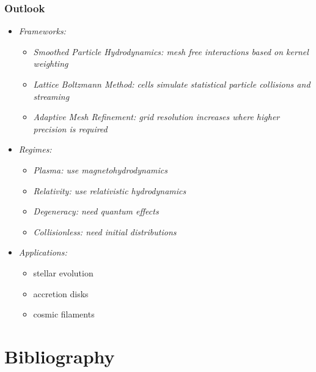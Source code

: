 	\begin{frame}
		\frametitle{Outlook}
		\begin{itemize}
			\item<2-> \itshape{Frameworks:}
			\begin{itemize}
				\item<3-> \itshape{Smoothed Particle Hydrodynamics:} mesh free interactions based on kernel weighting
				\item<4-> \itshape{Lattice Boltzmann Method:} cells simulate statistical particle collisions and streaming
				\item<5-> \itshape{Adaptive Mesh Refinement:} grid resolution increases where higher precision is required
			\end{itemize}
			\item<6-> \itshape{Regimes:}
			\setlength{\multicolsep}{1pt}
			\setlength{\columnsep}{1ex}
			\begin{multicols}{2}
				\begin{itemize}
					\item<7-> \itshape{Plasma:} use magnetohydrodynamics
					\item<8-> \itshape{Relativity:} use relativistic hydrodynamics
					\item<9-> \itshape{Degeneracy:} need quantum effects
					\item<10-> \itshape{Collisionless:} need initial distributions
				\end{itemize}
			\end{multicols}
			\item<11-> \itshape{Applications:}
			\setlength{\multicolsep}{1pt}
			\setlength{\columnsep}{-20ex}
			\begin{multicols}{3}
				\begin{itemize}
					\item<12-> stellar evolution
					\item<13-> accretion disks
					\item<14-> cosmic filaments
				\end{itemize}
			\end{multicols}
		\end{itemize}
	\end{frame}

	\section{Bibliography}

